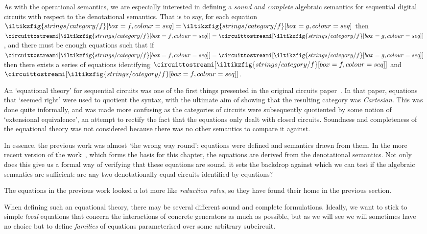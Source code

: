 As with the operational semantics, we are especially interested in defining a
\emph{sound and complete} algebraic semantics for sequential digital circuits
with respect to the denotational semantics.
That is to say, for each equation \(
\iltikzfig{strings/category/f}[box=f,colour=seq]
=
\iltikzfig{strings/category/f}[box=g,colour=seq]
\) then \(
\circuittostreami[\iltikzfig{strings/category/f}[box=f,colour=seq]]
=
\circuittostreami[\iltikzfig{strings/category/f}[box=g,colour=seq]]
\), and there must be enough equations such that if \(
\circuittostreami[\iltikzfig{strings/category/f}[box=f,colour=seq]]
=
\circuittostreami[\iltikzfig{strings/category/f}[box=g,colour=seq]]
\) then there exists a series of equations identifying \(
\circuittostreami[\iltikzfig{strings/category/f}[box=f,colour=seq]]
\) and \(
\circuittostreami[\iltikzfig{strings/category/f}[box=f,colour=seq]]
\).

\begin{remark}
    An `equational theory' for sequential circuits was one of the first things
    presented in the original circuits
    paper~\cite{ghica2016categorical,ghica2017diagrammatic}.
    In that paper, equations that `seemed right' were used to quotient the
    syntax, with the ultimate aim of showing that the resulting category was
    \emph{Cartesian}.
    This was done quite informally, and was made more confusing as
    the categories of circuits were subsequently quotiented by some notion of
    `extensional equivalence', an attempt to rectify the fact that the
    equations only dealt with closed circuits.
    Soundness and completeness of the equational theory was not considered
    because there was no other semantics to compare it against.

    In essence, the previous work was almost `the wrong way round': equations
    were defined and semantics drawn from them.
    In the more recent version of the work~\cite[Sec. 5]{ghica2024fully}, which
    forms the basis for this chapter, the equations are derived from the
    denotational semantics.
    Not only does this give us a formal way of verifying that these equations
    are sound, it sets the backdrop against which we can test if the algebraic
    semantics are sufficient: are any two denotationally equal circuits
    identified by equations?

    The equations in the previous work looked a lot more like
    \emph{reduction rules}, so they have found their home in the previous
    section.
\end{remark}

When defining such an equational theory, there may be several different sound
and complete formulations.
Ideally, we want to stick to simple \emph{local} equations that concern the
interactions of concrete generators as much as possible, but as we will see
we will sometimes have no choice but to define \emph{families} of equations
parameterised over some arbitrary subcircuit.






